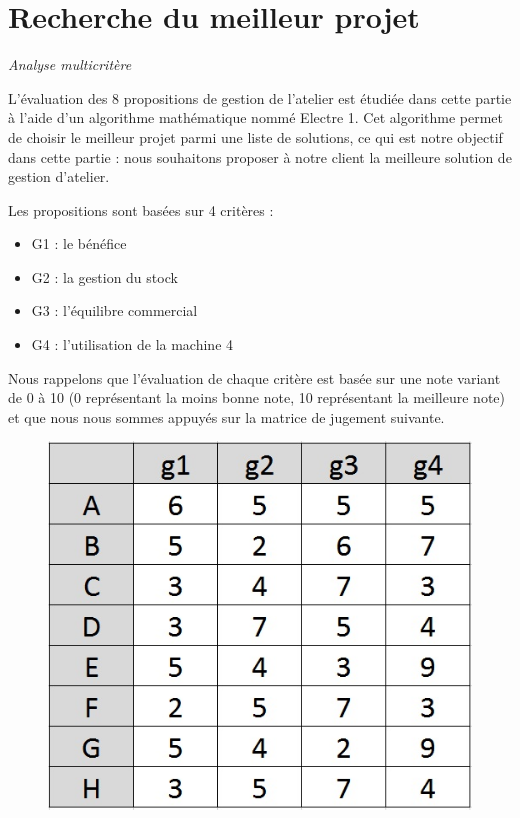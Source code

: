 \documentclass[a4paper,10pt]{article}
\begin{document}
\newpage
\part{Recherche du meilleur projet}
\begin{large}
\emph{Analyse multicritère} \\
\end{large}

L'évaluation des 8 propositions de gestion de l'atelier est étudiée dans cette partie à l'aide d'un algorithme mathématique nommé Electre 1. Cet algorithme permet de choisir le meilleur projet parmi une liste de solutions, ce qui est notre objectif dans cette partie : nous souhaitons proposer à notre client la meilleure solution de gestion d'atelier.

Les propositions sont basées sur 4 critères  :
\begin{itemize}
\item G1 : le bénéfice
\item G2 : la gestion du stock
\item G3 : l'équilibre commercial
\item G4 : l'utilisation de la machine 4
\end{itemize}

Nous rappelons que l'évaluation de chaque critère est basée sur une note variant de 0 à 10 (0 représentant la moins bonne note, 10 représentant la meilleure note) et que nous nous sommes appuyés sur la matrice de jugement suivante.

\begin{figure}[h]
\begin{center}
\includegraphics[scale=0.3]{img/AD-Jugement.jpg}
\end{center}
\end{figure}
\end{document}
